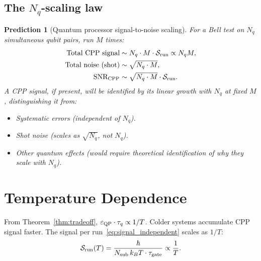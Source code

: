 \documentclass[11pt,a4paper]{article}
\newtheorem{prediction}[theorem]{Prediction}
\newcommand{\eps}{\varepsilon}
\begin{document}
\subsection{The $N_q$-scaling law}

\begin{prediction}[Quantum processor signal-to-noise scaling]
\label{pred:scaling}
For a Bell test on $N_q$ simultaneous qubit pairs, run $M$ times:
\begin{align}
\text{Total CPP signal} &\sim N_q \cdot M \cdot \mathcal{S}_{\rm run}
\propto N_q M, \label{eq:total_signal} \\
\text{Total noise (shot)} &\sim \sqrt{N_q \cdot M}, \label{eq:total_noise} \\
\text{SNR}_{\rm CPP} &\sim \sqrt{N_q \cdot M} \cdot \mathcal{S}_{\rm run}.
\label{eq:SNR}
\end{align}
A CPP signal, if present, will be identified by its \emph{linear
growth with $N_q$} at fixed $M$, distinguishing it from:
\begin{itemize}
\item Systematic errors (independent of $N_q$).
\item Shot noise (scales as $\sqrt{N_q}$, not $N_q$).
\item Other quantum effects (would require theoretical
  identification of why they scale with $N_q$).
\end{itemize}
\end{prediction}

\section{Temperature Dependence}
\label{sec:temperature}

From Theorem~\ref{thm:tradeoff}, $\eps_{\rm QP} \cdot \tau_q
\propto 1/T$.  Colder systems accumulate CPP signal faster.
The signal per run~\eqref{eq:signal_independent} scales as $1/T$:
\begin{equation}
\mathcal{S}_{\rm run}(T) = \frac{\hbar}{N_{\rm sub}\, k_B T
  \cdot \tau_{\rm gate}} \propto \frac{1}{T}.
\label{eq:S_T}
\end{equation}
\end{document}
